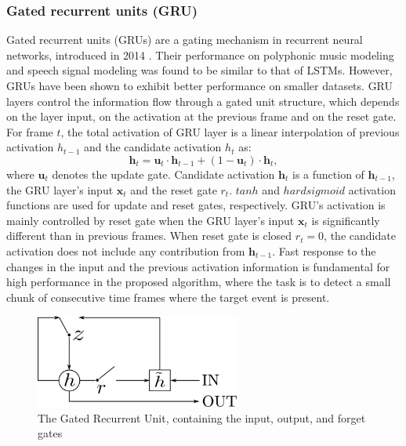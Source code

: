 \subsubsection{Gated recurrent units (GRU)}
\label{sssec:GRU}
Gated recurrent units (GRUs) are a gating mechanism in recurrent neural networks, introduced in 2014 \cite{chung2014empirical}. Their performance on polyphonic music modeling and speech signal modeling was found to be similar to that of LSTMs. However, GRUs have been shown to exhibit better performance on smaller datasets. 
GRU layers control the information flow through a gated unit structure, which depends on the layer input, on the activation at the previous frame and on the reset gate.
For frame $t$, the total activation of GRU layer is a linear interpolation of previous activation $h_{t-1}$ and the candidate activation $h_t$ as:
\begin{equation}
\boldsymbol{h}_t  = \boldsymbol{u}_t  \cdot \boldsymbol{h}_{t-1}  + (1 - \boldsymbol{u}_t ) \cdot \boldsymbol{h}_t ,
\end{equation}
where $\boldsymbol{u}_t$ denotes the update gate. 
Candidate activation $\boldsymbol{h}_t$ is a function of $ \boldsymbol{h}_{t-1}$, the GRU layer’s input  $\boldsymbol{x}_{t}$ and the reset gate ${r}_{t}$. $tanh$ and $hard sigmoid$ activation functions are used for update and reset gates, respectively.
GRU's activation is mainly controlled by reset gate when the GRU layer’s input $\boldsymbol{x}_{t}$ is significantly different than in previous frames. When reset gate is closed $r_{t} = 0$, the candidate activation does not include any contribution from $\boldsymbol{h}_{t-1}$. 
Fast response to the changes in the input and the previous activation information is fundamental for high performance in the proposed algorithm, where the task is to detect a small chunk of consecutive time frames where the target event is present. 

\begin{figure}[h]
	\centering
	\includegraphics[width=0.6\textwidth]{img/GRU.png}
	\caption[GRU]{The Gated Recurrent Unit, containing the input, output, and forget gates}
	\label{fig:GRU}
\end{figure}


